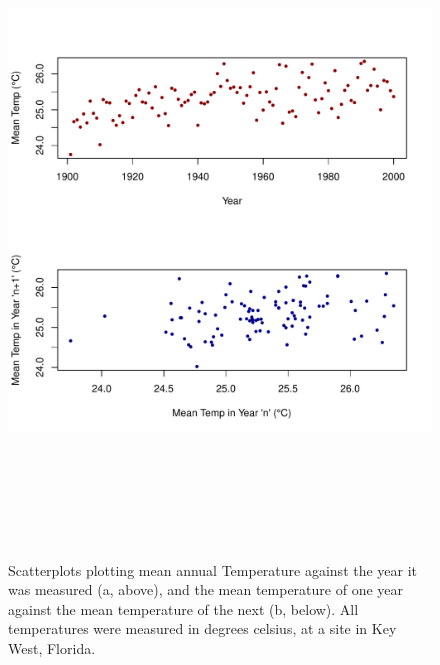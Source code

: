 \documentclass[12pt]{article}
\begin{document}
\begin{figure}[tp!]
\centering
\includegraphics[width = 6in, height = 7in]{../../week3/data/ACC_Data.pdf}
\caption{Scatterplots plotting mean annual Temperature against the year it 
was measured (a, above), and the mean temperature of one year against 
the mean temperature of the next (b, below). All temperatures were measured in
degrees celsius, at a site in Key West, Florida.}
\label{fig:Figure 1a&b}
\end{figure}

\newpage
\end{document}
